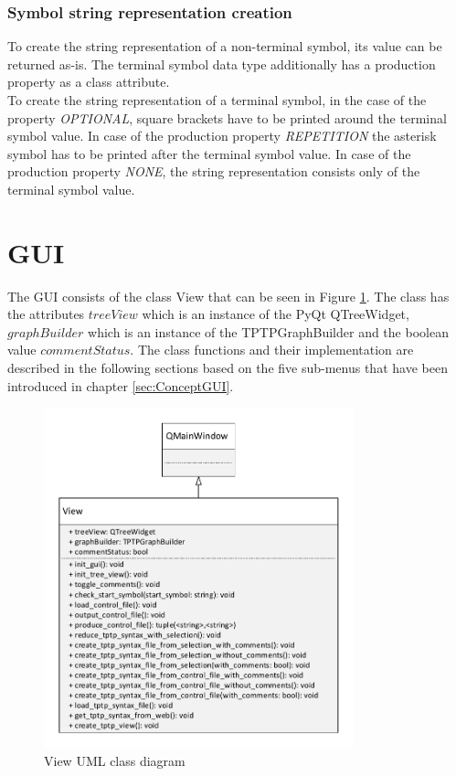 \subsubsection{Symbol string representation creation}
To create the string representation of a non-terminal symbol, its value can be returned as-is.
The terminal symbol data type additionally has a production property as a class attribute.\\
To create the string representation of a terminal symbol, in the case of the property \textit{OPTIONAL}, square brackets have to be printed around the terminal symbol value. In case of the production property \textit{REPETITION} the asterisk symbol has to be printed after the terminal symbol value. In case of the production property \textit{NONE}, the string representation consists only of the terminal symbol value.

\section{GUI}\label{sec:ImplementationGUI}

The GUI consists of the class View that can be seen in Figure \ref{fig:ImplementationViewClassDiagram}. The class has the attributes $treeView$ which is an instance of the PyQt QTreeWidget, $graphBuilder$ which is an instance of the TPTPGraphBuilder and the boolean value $commentStatus$. The class functions and their implementation are described in the following sections based on the five sub-menus that have been introduced in chapter \ref{sec:ConceptGUI}.

\begin{figure}[H]
\centering
\includegraphics[width=0.8\textwidth]{images/Implementation_view_class_diagramm.pdf}
\caption{View UML class diagram}
\label{fig:ImplementationViewClassDiagram}
\end{figure}

